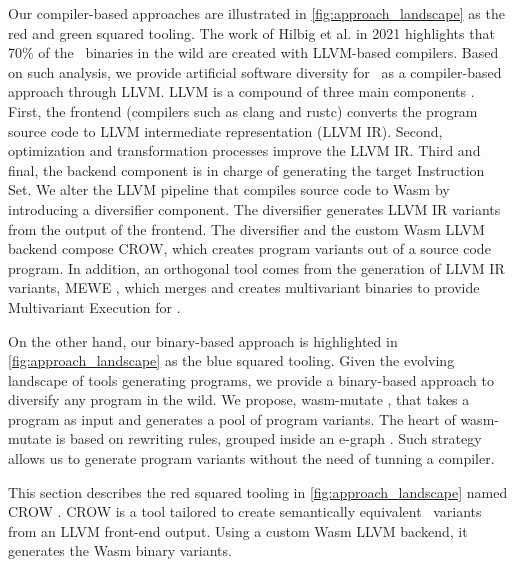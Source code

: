 Our compiler-based approaches are illustrated in \autoref{fig:approach_landscape} as the red  and green squared tooling.
The work of Hilbig et al. \cite{Hilbig2021AnES} in 2021 highlights that 70\% of the \wasm\ binaries in the wild are created with LLVM-based compilers. 
Based on such analysis, we provide artificial software diversity for \wasm\ as a compiler-based approach through LLVM.
LLVM is a compound of three main components \cite{llvmofficialweb}. 
First, the frontend (compilers such as clang and rustc) converts the program source code to LLVM intermediate representation (LLVM IR). 
Second, optimization and transformation processes improve the LLVM IR. 
Third and final, the backend component is in charge of generating the target Instruction Set.
We alter the LLVM pipeline that compiles source code to Wasm by introducing a diversifier component.  
The diversifier generates LLVM IR variants from the output of the frontend. 
The diversifier and the custom Wasm LLVM backend compose CROW, which creates \wasm program variants out of a source code program. 
In addition, an orthogonal tool comes from the generation of LLVM IR variants, MEWE \cite{MEWE}, which merges and creates multivariant binaries to provide Multivariant Execution for \wasm.  

On the other hand, our binary-based approach is highlighted in \autoref{fig:approach_landscape} as the blue squared tooling.
Given the evolving landscape of tools generating \Wasm programs, we provide a binary-based approach to diversify any \Wasm program in the wild.
We propose, wasm-mutate \cite{wasm-mutate}, that takes a \Wasm program as input and generates a pool of \Wasm program variants. 
The heart of wasm-mutate is based on rewriting rules, grouped inside an e-graph \cite{e-graph}.
Such strategy allows us to generate \Wasm program variants without the need of tunning a compiler.






\label{section:crow}

This section describes the red squared tooling in \autoref{fig:approach_landscape} named CROW  \cite{CROW}. 
CROW is a tool tailored to create semantically equivalent \wasm\ variants from an LLVM front-end output.
Using a custom Wasm LLVM backend, it generates the Wasm binary variants.


